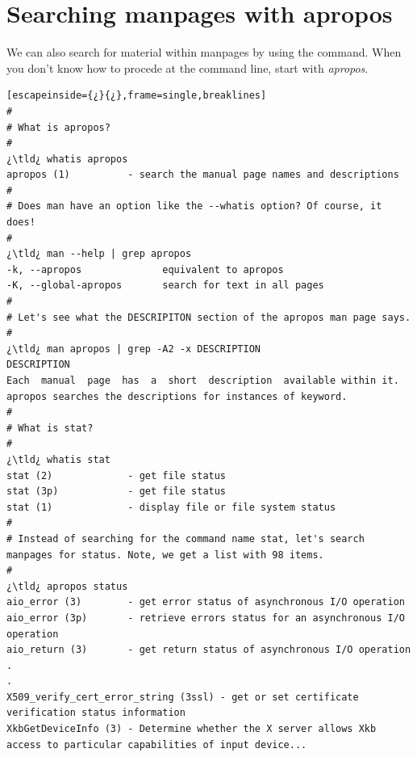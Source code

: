 \section{Searching manpages with apropos}

We can also search for material within manpages by using the  command. When you don't know how to procede at the command line, start with \emph{apropos}.

\begin{lstlisting}[escapeinside={¿}{¿},frame=single,breaklines]
#
# What is apropos?
#
¿\tld¿ whatis apropos
apropos (1)          - search the manual page names and descriptions
#
# Does man have an option like the --whatis option? Of course, it does!
#
¿\tld¿ man --help | grep apropos
-k, --apropos              equivalent to apropos
-K, --global-apropos       search for text in all pages
#
# Let's see what the DESCRIPITON section of the apropos man page says.
#
¿\tld¿ man apropos | grep -A2 -x DESCRIPTION
DESCRIPTION
Each  manual  page  has  a  short  description  available within it.  apropos searches the descriptions for instances of keyword.
#
# What is stat?
#
¿\tld¿ whatis stat
stat (2)             - get file status
stat (3p)            - get file status
stat (1)             - display file or file system status
#
# Instead of searching for the command name stat, let's search manpages for status. Note, we get a list with 98 items.
#
¿\tld¿ apropos status
aio_error (3)        - get error status of asynchronous I/O operation
aio_error (3p)       - retrieve errors status for an asynchronous I/O operation
aio_return (3)       - get return status of asynchronous I/O operation
.
.
X509_verify_cert_error_string (3ssl) - get or set certificate verification status information
XkbGetDeviceInfo (3) - Determine whether the X server allows Xkb access to particular capabilities of input device...


\end{lstlisting}
